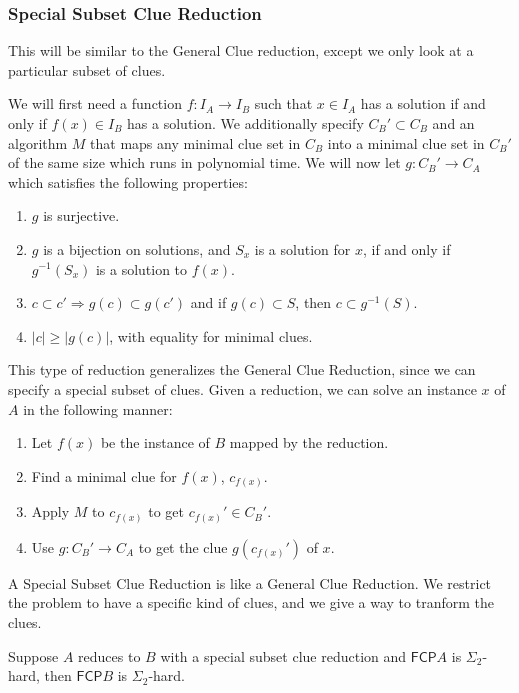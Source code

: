 \documentclass[runningheads,a4paper]{llncs}
\begin{document}
\subsubsection{Special Subset Clue Reduction} This will be similar to the General Clue reduction, except we only look at a particular subset of clues.

We will first need a function $f: I_A \rightarrow I_B$ such that $x \in I_A$ has a solution if and only if $f(x) \in I_B$ has a solution. We additionally specify $C_B' \subset C_B$ and an algorithm $M$ that maps any minimal clue set in $C_B$ into a minimal clue set in $C_B'$ of the same size which runs in polynomial time. We will now let $g: C_B' \rightarrow C_A$ which satisfies the following properties:
\begin{enumerate}
\item $g$ is surjective.
\item $g$ is a bijection on solutions, and $S_x$ is a solution for $x$, if and only if $g^{-1}(S_x)$ is a solution to $f(x)$. 
\item $c \subset c' \Rightarrow g(c) \subset g(c')$ and if $g(c) \subset S$, then $c \subset g^{-1}(S)$.
\item $|c| \geq |g(c)|$, with equality for minimal clues.   
\end{enumerate} 
This type of reduction generalizes the General Clue Reduction, since we can specify a special subset of clues. Given a reduction, we can solve an instance $x$ of $A$ in the following manner:
\begin{enumerate}
\item Let $f(x)$ be the instance of $B$ mapped by the reduction.
\item Find a minimal clue for $f(x)$, $c_{f(x)}$. 
\item Apply $M$ to $c_{f(x)}$ to get $c_{f(x)}' \in C_B'$. 
\item Use $g: C_B' \rightarrow C_A$ to get the clue $g(c_{f(x)}')$ of $x$.
\end{enumerate}

A Special Subset Clue Reduction is like a General Clue Reduction. We restrict the problem to have a specific kind of clues, and we give a way to tranform the clues. 

\begin{corollary}
\label{thm:special_reduc}
Suppose $A$ reduces to $B$ with a special subset clue reduction and $\mathsf{FCP} A$ is $\Sigma_2$-hard, then $\mathsf{FCP} B$ is $\Sigma_2$-hard. 
\end{corollary}
\end{document}
